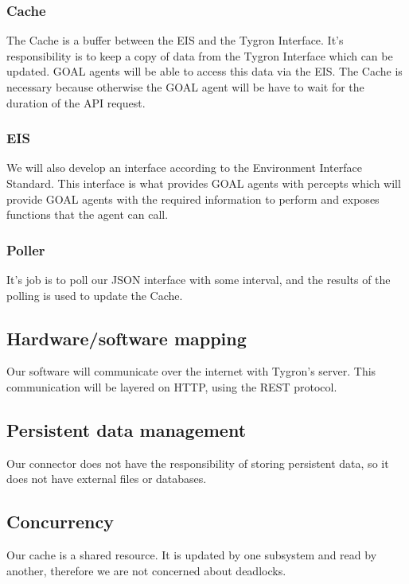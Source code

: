 \documentclass[a4paper]{article}
\begin{document}
\subsubsection{Cache}
The Cache is a buffer between the EIS and the Tygron Interface. It’s responsibility is to keep a copy of data from the Tygron Interface which can be updated. GOAL agents will be able to access this data via the EIS. The Cache is necessary because otherwise the GOAL agent will be have to wait for the duration of the API request.

\subsubsection{EIS}
We will also develop an interface according to the Environment Interface Standard. This interface is what provides GOAL agents with percepts which will provide GOAL agents with the required information to perform and exposes functions that the agent can call.

\subsubsection{Poller}
It’s job is to poll our JSON interface with some interval, and the results of the polling is used to update the Cache. 

\subsection{Hardware/software mapping}
Our software will communicate over the internet with Tygron’s server. This communication will be layered on HTTP, using the REST protocol.

\subsection{Persistent data management}
Our connector does not have the responsibility of storing persistent data, so it does not have external files or databases.

\subsection{Concurrency}
Our cache is a shared resource. It is updated by one subsystem and read by another, therefore we are not concerned about deadlocks.

\clearpage
\end{document}
